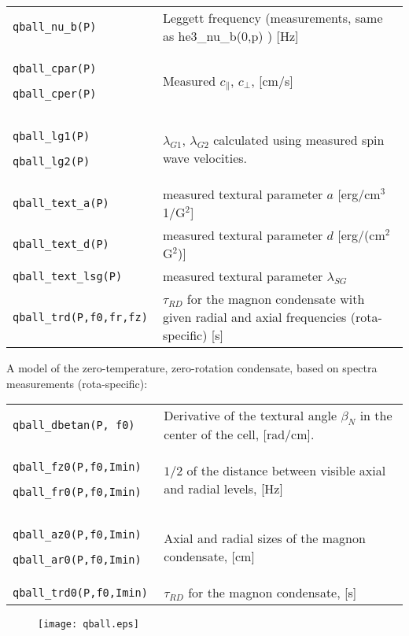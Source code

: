 \documentclass[a4paper]{article}
\begin{document}
\medskip
\noindent\begin{tabular}{p{4cm}p{11cm}}
\tt qball\_nu\_b(P) & Leggett frequency (measurements, same as he3\_nu\_b(0,p) ) [Hz]\\
\tt qball\_cpar(P)\par
\tt qball\_cper(P)  & Measured $c_\parallel$, $c_\perp$, [cm/s]\\
\tt qball\_lg1(P)\par
\tt qball\_lg2(P)    & $\lambda_{G1}$, $\lambda_{G2}$ calculated
                      using measured spin wave velocities.\\
\tt qball\_text\_a(P)      &  measured textural parameter $a$ [erg/cm$^3$ 1/G$^2$]\\
\tt qball\_text\_d(P)      &  measured textural parameter $d$ [erg/(cm$^2$ G$^2$)]\\
\tt qball\_text\_lsg(P)    &  measured textural parameter $\lambda_{SG}$\\

\tt qball\_trd(P,f0,fr,fz) & $\tau_{RD}$ for the magnon condensate with given radial and axial frequencies (rota-specific) [s]\\
\end{tabular}

A model of the zero-temperature, zero-rotation condensate, based on spectra measurements (rota-specific):

\medskip
\noindent\begin{tabular}{p{4cm}p{11cm}}
\tt qball\_dbetan(P, f0)  & Derivative of the textural angle $\beta_N$ in the center of the cell, [rad/cm].\\
\tt qball\_fz0(P,f0,Imin)\par
\tt qball\_fr0(P,f0,Imin)  & $1/2$ of the distance between visible axial and radial levels, [Hz]\\
\tt qball\_az0(P,f0,Imin)\par
\tt qball\_ar0(P,f0,Imin)  & Axial and radial sizes of the magnon condensate, [cm]\\
\tt qball\_trd0(P,f0,Imin) & $\tau_{RD}$ for the magnon condensate, [s]\\
\end{tabular}

\begin{figure}[h]
\texttt{[image: qball.eps]}\\
\end{figure}


\end{document}
